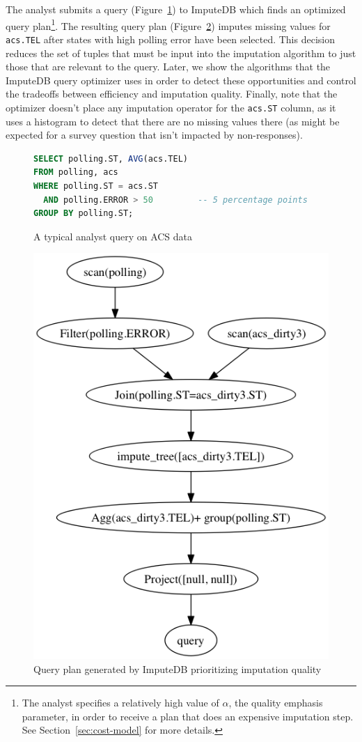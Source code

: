 The analyst submits a query (Figure~\ref{fig:example-query}) to ImputeDB which finds an optimized query
plan\footnote{The analyst specifies a relatively high value of $\alpha$, the quality
emphasis parameter, in order to receive a plan that does an expensive imputation step. See
Section~\ref{sec:cost-model} for more details.}. The resulting query plan
(Figure~\ref{fig:query-plan})
imputes missing values for \verb!acs.TEL! after states with high polling error have been
selected. This decision reduces the set of tuples that must be input into the imputation
algorithm to just those that are relevant to the query. Later, we show the algorithms that
the ImputeDB query optimizer uses in order to detect these opportunities and control the
tradeoffs between efficiency and imputation quality. Finally, note that the optimizer doesn't
place any imputation operator for the \verb|acs.ST| column, as it uses a histogram to
detect that there are no missing values there (as might be expected for a survey question that isn't
impacted by non-responses).

\begin{figure}
\begin{lstlisting}[language=SQL]
SELECT polling.ST, AVG(acs.TEL)
FROM polling, acs
WHERE polling.ST = acs.ST
  AND polling.ERROR > 50         -- 5 percentage points
GROUP BY polling.ST;
\end{lstlisting}
\caption{A typical analyst query on ACS data}
\label{fig:example-query}
\end{figure}

\begin{figure}[!ht]
    \centering
    \includegraphics[width=0.6\columnwidth]{figures/example.png}
    \caption{Query plan generated by ImputeDB prioritizing imputation quality}
    \label{fig:query-plan}
\end{figure}
        
